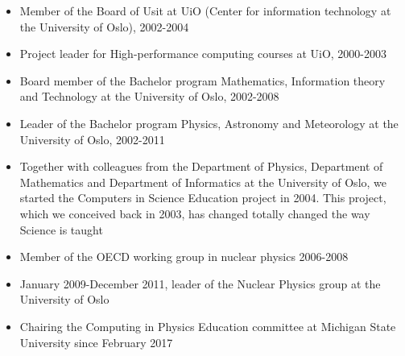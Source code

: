 \documentclass[a4wide,10pt]{article}
\begin{document}
\begin{itemize}
\item Member of the Board of Usit at UiO (Center for information technology at the University of Oslo), 2002-2004

\item Project leader for High-performance computing courses at UiO, 2000-2003

\item Board member of the Bachelor program Mathematics, Information theory and Technology at the University of Oslo, 2002-2008

\item Leader of the Bachelor program Physics, Astronomy and Meteorology at the University of Oslo, 2002-2011

\item Together with colleagues from the Department of Physics, Department of Mathematics and Department of Informatics at the University of Oslo, we started   the Computers in Science Education project in 2004. This project, which we conceived back in 2003,  has changed totally changed the way Science is taught

\item Member of the OECD working group in nuclear physics 2006-2008

\item January 2009-December 2011, leader of the Nuclear Physics group at the University of Oslo

\item Chairing the Computing in Physics Education committee at Michigan State University since February 2017 
\end{itemize}

\end{document}
